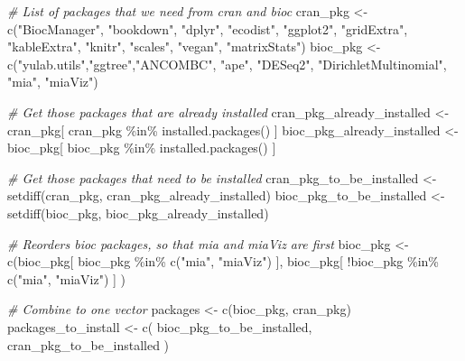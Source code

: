 \documentclass[
  oneside]{book}
\newenvironment{Shaded}{\begin{snugshade}}{\end{snugshade}}
\newcommand{\CommentTok}[1]{\textcolor[rgb]{0.56,0.35,0.01}{\textit{#1}}}
\newcommand{\FunctionTok}[1]{\textcolor[rgb]{0.00,0.00,0.00}{#1}}
\newcommand{\NormalTok}[1]{#1}
\newcommand{\OtherTok}[1]{\textcolor[rgb]{0.56,0.35,0.01}{#1}}
\newcommand{\SpecialCharTok}[1]{\textcolor[rgb]{0.00,0.00,0.00}{#1}}
\newcommand{\StringTok}[1]{\textcolor[rgb]{0.31,0.60,0.02}{#1}}
\begin{document}
\begin{Shaded}
\begin{Highlighting}[]
\CommentTok{\# List of packages that we need from cran and bioc }
\NormalTok{cran\_pkg }\OtherTok{\textless{}{-}} \FunctionTok{c}\NormalTok{(}\StringTok{"BiocManager"}\NormalTok{, }\StringTok{"bookdown"}\NormalTok{, }\StringTok{"dplyr"}\NormalTok{, }\StringTok{"ecodist"}\NormalTok{, }\StringTok{"ggplot2"}\NormalTok{, }
              \StringTok{"gridExtra"}\NormalTok{, }\StringTok{"kableExtra"}\NormalTok{,  }\StringTok{"knitr"}\NormalTok{, }\StringTok{"scales"}\NormalTok{, }\StringTok{"vegan"}\NormalTok{, }\StringTok{"matrixStats"}\NormalTok{)}
\NormalTok{bioc\_pkg }\OtherTok{\textless{}{-}} \FunctionTok{c}\NormalTok{(}\StringTok{"yulab.utils"}\NormalTok{,}\StringTok{"ggtree"}\NormalTok{,}\StringTok{"ANCOMBC"}\NormalTok{, }\StringTok{"ape"}\NormalTok{, }\StringTok{"DESeq2"}\NormalTok{, }\StringTok{"DirichletMultinomial"}\NormalTok{, }\StringTok{"mia"}\NormalTok{, }\StringTok{"miaViz"}\NormalTok{)}

\CommentTok{\# Get those packages that are already installed}
\NormalTok{cran\_pkg\_already\_installed }\OtherTok{\textless{}{-}}\NormalTok{ cran\_pkg[ cran\_pkg }\SpecialCharTok{\%in\%} \FunctionTok{installed.packages}\NormalTok{() ]}
\NormalTok{bioc\_pkg\_already\_installed }\OtherTok{\textless{}{-}}\NormalTok{ bioc\_pkg[ bioc\_pkg }\SpecialCharTok{\%in\%} \FunctionTok{installed.packages}\NormalTok{() ]}

\CommentTok{\# Get those packages that need to be installed}
\NormalTok{cran\_pkg\_to\_be\_installed }\OtherTok{\textless{}{-}} \FunctionTok{setdiff}\NormalTok{(cran\_pkg, cran\_pkg\_already\_installed)}
\NormalTok{bioc\_pkg\_to\_be\_installed }\OtherTok{\textless{}{-}} \FunctionTok{setdiff}\NormalTok{(bioc\_pkg, bioc\_pkg\_already\_installed)}

\CommentTok{\# Reorders bioc packages, so that mia and miaViz are first}
\NormalTok{bioc\_pkg }\OtherTok{\textless{}{-}} \FunctionTok{c}\NormalTok{(bioc\_pkg[ bioc\_pkg }\SpecialCharTok{\%in\%} \FunctionTok{c}\NormalTok{(}\StringTok{"mia"}\NormalTok{, }\StringTok{"miaViz"}\NormalTok{) ], }
\NormalTok{              bioc\_pkg[ }\SpecialCharTok{!}\NormalTok{bioc\_pkg }\SpecialCharTok{\%in\%} \FunctionTok{c}\NormalTok{(}\StringTok{"mia"}\NormalTok{, }\StringTok{"miaViz"}\NormalTok{) ] ) }

\CommentTok{\# Combine to one vector}
\NormalTok{packages }\OtherTok{\textless{}{-}} \FunctionTok{c}\NormalTok{(bioc\_pkg, cran\_pkg)}
\NormalTok{packages\_to\_install }\OtherTok{\textless{}{-}} \FunctionTok{c}\NormalTok{( bioc\_pkg\_to\_be\_installed, cran\_pkg\_to\_be\_installed )}
\end{Highlighting}
\end{Shaded}
\end{document}
